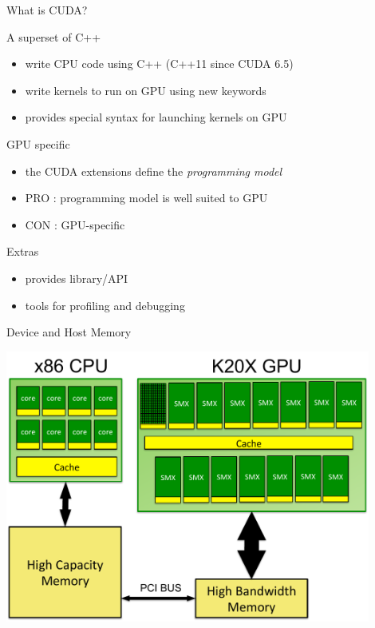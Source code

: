 \begin{frame}[fragile]{What is CUDA?}
    \begin{info}{A superset of C++}
        \begin{itemize}
            \item write CPU code using C++ (C++11 since CUDA 6.5)
            \item write kernels to run on GPU using new keywords
            \item provides special syntax for launching kernels on GPU
        \end{itemize}
    \end{info}

    \begin{info}{GPU specific}
        \begin{itemize}
            \item the CUDA extensions define the \emph{programming model}
            \item PRO : programming model is well suited to GPU
            \item CON : GPU-specific
        \end{itemize}
    \end{info}

    \begin{info}{Extras}
        \begin{itemize}
            \item provides library/API
            \item tools for profiling and debugging
        \end{itemize}
    \end{info}
\end{frame}

\begin{frame}[fragile]{Device and Host Memory}
    \begin{center}
        \includegraphics[width=0.9\textwidth]{./images/node.pdf}
    \end{center}
\end{frame}

